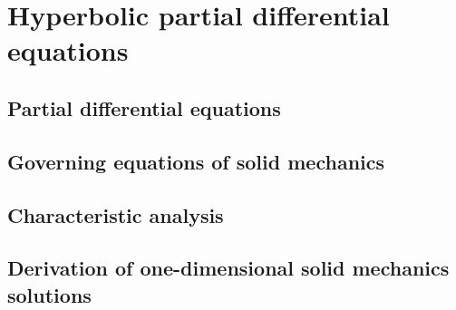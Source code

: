 \chapter{Hyperbolic partial differential equations}
\newpage
\section{Partial differential equations}
\label{sec:PDEs}


\section{Governing equations of solid mechanics}
\label{sec:solidMech_equations}



\section{Characteristic analysis}
\label{sec:characteristic_analysis}
%


\section{Derivation of one-dimensional solid mechanics solutions}
\label{sec:analytical_results}
%




